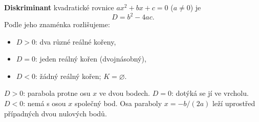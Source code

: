 \documentclass[11pt,a4paper]{article}
\begin{document}
\begin{definiceBox}[title={Definice - Diskriminant kvadratické rovnice}]
\textbf{Diskriminant} kvadratické rovnice $ax^2+bx+c=0$ ($a\ne0$) je
\[ D=b^2-4ac. \]
Podle jeho znaménka rozlišujeme:
\begin{itemize}
\item $D>0$: dva různé reálné kořeny,
\item $D=0$: jeden reálný kořen (dvojnásobný),
\item $D<0$: žádný reálný kořen; $K=\varnothing$.
\end{itemize}
\end{definiceBox}
$D>0$: parabola protne osu $x$ ve dvou bodech. $D=0$: dotýká se jí ve vrcholu.
$D<0$: nemá s osou $x$ společný bod. Osa paraboly $x=-b/(2a)$ leží
uprostřed případných dvou nulových bodů.
\end{document}
